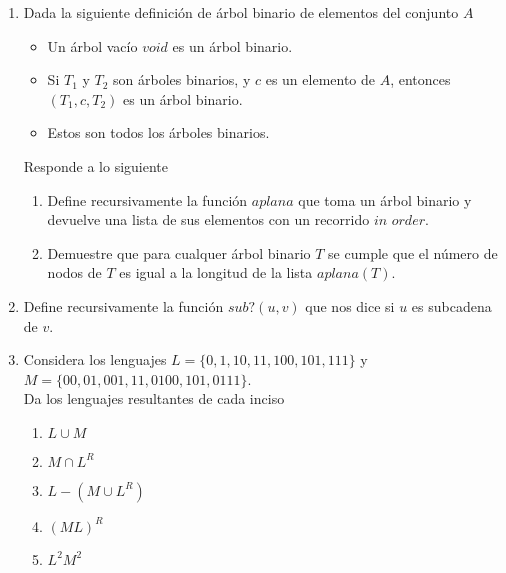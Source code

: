 \documentclass{article}
\begin{document}
\begin{enumerate}
{\begin{enumerate}
            \end{enumerate}
        }
        \item {
            Dada la siguiente definición de árbol binario de elementos del 
            conjunto $A$
            \begin{itemize}
                \item {
                    Un árbol vacío $void$ es un árbol binario.
                }
                \item {
                    Si $T_1$ y $T_2$ son árboles binarios, y $c$ es un elemento 
                    de $A$, entonces $(T_1, c, T_2)$ es un árbol binario.
                }
                \item {
                    Estos son todos los árboles binarios.
                }
            \end{itemize}
            Responde a lo siguiente
            \begin{enumerate}
                \item {
                    Define recursivamente la función $aplana$ que toma
                    un árbol binario y devuelve una lista de sus elementos con 
                    un recorrido $\textit{in order}$.
                }
                \item {
                    Demuestre que para cualquer árbol binario $T$ se cumple que
                    el número de nodos de $T$ es igual a la longitud de la lista 
                    $aplana(T)$.
                }
            \end{enumerate}
        }
        \item {
            Define recursivamente la función $sub?(u, v)$ que nos dice si $u$ 
            es subcadena de $v$.
        }
        \item {
            Considera los lenguajes $L = \{ 0, 1, 10, 11, 100, 101, 111 \}$ y 
            $M = \{ 00, 01, 001, 11, 0100, 101, 0111 \}$.\\
            Da los lenguajes resultantes de cada inciso
            \begin{enumerate}
                \item {
                    $L \cup M$
                }
                \item {
                    $M \cap L^R$
                }
                \item {
                    $L - (M \cup L^R)$
                }
                \item {
                    $(ML)^R$
                }
                \item {
                    $L^2M^2$
                }
            \end{enumerate}
        }
    \end{enumerate}
\end{document}
